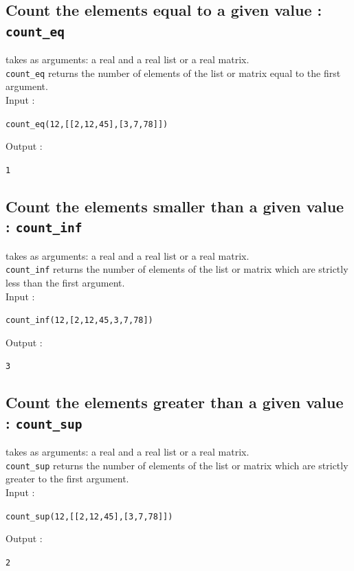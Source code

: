\documentclass[a4paper,11pt]{book}
\begin{document}
\subsection{Count the elements equal to a given value : {\tt count\_eq}}
 takes as arguments: a real and a real list or 
a real matrix.\\
{\tt count\_eq} returns the number of elements of the list or matrix
equal to the first argument.\\
Input :
\begin{center}{\tt count\_eq(12,[[2,12,45],[3,7,78]])}\end{center}
Output :
\begin{center}{\tt  1}\end{center}

\subsection{Count the elements smaller than a given value : {\tt count\_inf}}
 takes as arguments: a real and a real list or a real
matrix.\\
{\tt count\_inf} returns the number of elements of the list or
matrix which are strictly less than the first argument.\\
Input :
\begin{center}{\tt count\_inf(12,[2,12,45,3,7,78])}\end{center}
Output :
\begin{center}{\tt  3}\end{center}

\subsection{Count the elements greater than a given value : {\tt count\_sup}}
 takes as arguments: a real and a real list or a real
 matrix.\\
{\tt count\_sup} returns the number of elements of the list or matrix
which are strictly greater to the first argument.\\
Input :
\begin{center}{\tt count\_sup(12,[[2,12,45],[3,7,78]])}\end{center}
Output :
\begin{center}{\tt  2}\end{center}
\end{document}
